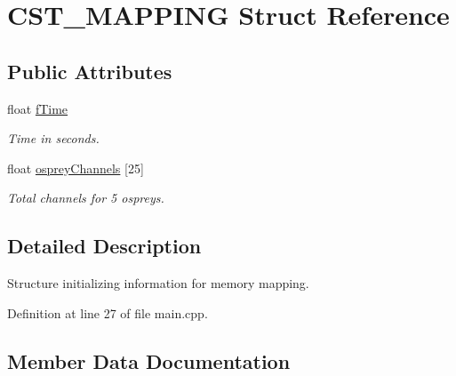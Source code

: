 \hypertarget{struct_c_s_t___m_a_p_p_i_n_g}{}\section{C\+S\+T\+\_\+\+M\+A\+P\+P\+I\+NG Struct Reference}
\label{struct_c_s_t___m_a_p_p_i_n_g}
\subsection*{Public Attributes}
\begin{DoxyCompactItemize}
\item 
\mbox{\label{struct_c_s_t___m_a_p_p_i_n_g_a00b4c49d7f865a80b2b92ef60049ae4c}} 
float \hyperlink{struct_c_s_t___m_a_p_p_i_n_g_a00b4c49d7f865a80b2b92ef60049ae4c}{f\+Time}
\begin{DoxyCompactList}\small\item\em Time in seconds. \end{DoxyCompactList}\item 
\mbox{\label{struct_c_s_t___m_a_p_p_i_n_g_a15a94aba68ce13addacd8a8541fee0e5}} 
float \hyperlink{struct_c_s_t___m_a_p_p_i_n_g_a15a94aba68ce13addacd8a8541fee0e5}{osprey\+Channels} \mbox{[}25\mbox{]}
\begin{DoxyCompactList}\small\item\em Total channels for 5 ospreys. \end{DoxyCompactList}\end{DoxyCompactItemize}


\subsection{Detailed Description}
Structure initializing information for memory mapping. 

Definition at line 27 of file main.\+cpp.



\subsection{Member Data Documentation}
\mbox{\label{struct_c_s_t___m_a_p_p_i_n_g_a00b4c49d7f865a80b2b92ef60049ae4c}} 

